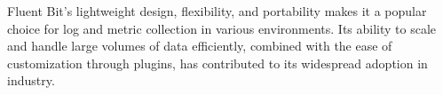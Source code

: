 Fluent Bit's lightweight design, flexibility, and portability makes it a popular choice for log and metric collection in various environments. Its ability to scale and handle large volumes of data efficiently, combined with the ease of customization through plugins, has contributed to its widespread adoption in industry.
